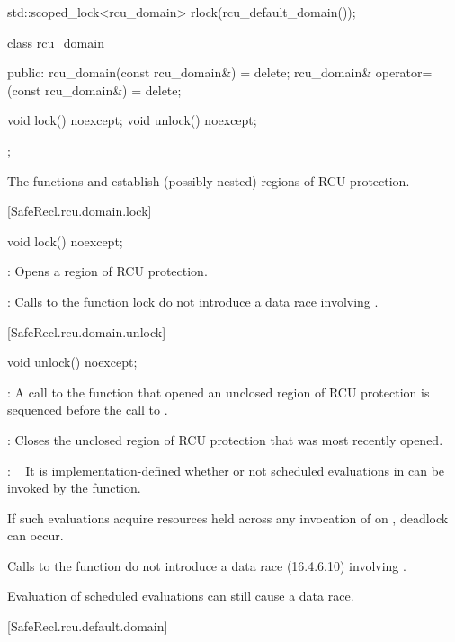 \begin{codeblock}
std::scoped_lock<rcu_domain> rlock(rcu_default_domain());
\end{codeblock}

\begin{codeblock}
class rcu_domain {
public:
  rcu_domain(const rcu_domain&) = delete;
  rcu_domain& operator=(const rcu_domain&) = delete;

  void lock() noexcept;
  void unlock() noexcept;
};
\end{codeblock}

The functions  and  establish (possibly nested)
regions of RCU protection.

[SafeRecl.rcu.domain.lock]{}

\begin{codeblock}
void lock() noexcept;
\end{codeblock}

\pnum
{}: Opens a region of RCU protection.

\pnum
{}: Calls to the function lock do not introduce a data race
 involving .

[SafeRecl.rcu.domain.unlock]{}

\begin{codeblock}
void unlock() noexcept;
\end{codeblock}

\pnum
{}: A call to the function  that opened
an unclosed region of RCU protection is sequenced before the
call to .

\pnum
{}: Closes the unclosed region of RCU protection that was
most recently opened.

\pnum
{}:   It is implementation-defined whether or not scheduled
evaluations in  can be invoked by the 
function.
\begin{note}
If such evaluations acquire resources held across any invocation
of  on , deadlock can occur.
\end{note}
Calls to the function  do not introduce a data race
(16.4.6.10) involving .
\begin{note}
Evaluation of scheduled evaluations can still cause a data race.
\end{note}

[SafeRecl.rcu.default.domain]{}


